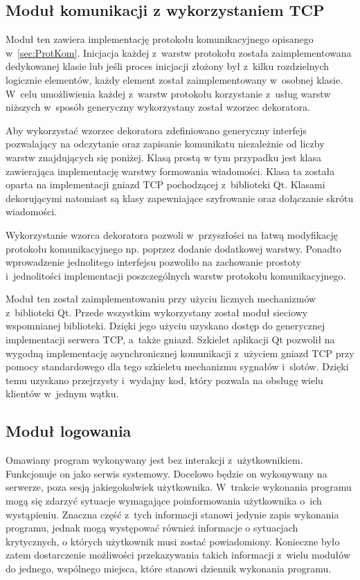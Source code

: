 \subsection[Moduł TCP][Moduł komunikacji z wykorzystaniem TCP]{Moduł komunikacji z wykorzystaniem TCP}

Moduł ten zawiera implementację protokołu komunikacyjnego opisanego
w~\ref{sec:ProtKom}. Inicjacja każdej z~warstw protokołu została
zaimplementowana dedykowanej klasie lub jeśli proces inicjacji złożony
był z~kilku rozdzielnych logicznie elementów, każdy element został
zaimplementowany w~osobnej klasie. W~celu umożliwienia każdej z~warstw
protokołu korzystanie z~usług warstw niższych w~sposób generyczny
wykorzystany został wzorzec dekoratora.

Aby wykorzystać wzorzec dekoratora zdefiniowano generyczny interfejs
pozwalający na odczytanie oraz zapisanie komunikatu niezależnie od
liczby warstw znajdujących się poniżej. Klasą prostą w tym przypadku
jest klasa zawierająca implementację warstwy formowania
wiadomości. Klasa ta została oparta na implementacji gniazd TCP
pochodzącej z~biblioteki Qt. Klasami dekorującymi natomiast są klasy
zapewniające szyfrowanie oraz dołączanie skrótu wiadomości.


Wykorzystanie wzorca dekoratora pozwoli w~przyszłości na łatwą
modyfikację protokołu komunikacyjnego np. poprzez dodanie dodatkowej
warstwy. Ponadto wprowadzenie jednolitego interfejsu pozwoliło na
zachowanie prostoty i~jednolitości implementacji poszczególnych warstw
protokołu komunikacyjnego.

Moduł ten został zaimplementowaniu przy użyciu licznych mechanizmów
z~biblioteki Qt. Przede wszystkim wykorzystany został moduł sieciowy
wspomnianej biblioteki. Dzięki jego użyciu uzyskano dostęp do
generycznej implementacji serwera TCP, a~także gniazd. Szkielet
aplikacji Qt pozwolił na wygodną implementację asynchronicznej
komunikacji z~użyciem gniazd TCP przy pomocy standardowego dla tego
szkieletu mechanizmu sygnałów i~slotów. Dzięki temu uzyskano
przejrzysty i~wydajny kod, który pozwala na obsługę wielu klientów
w~jednym wątku.

\subsection[Moduł logowania][Moduł logowania]{Moduł logowania}

Omawiany program wykonywany jest bez interakcji
z~użytkownikiem. Funkcjonuje on jako serwis systemowy. Docelowo będzie
on wykonywany na serwerze, poza sesją jakiegokolwiek
użytkownika. W~trakcie wykonania programu mogą się zdarzyć sytuacje
wymagające poinformowania użytkownika o~ich wystąpieniu. Znaczna część
z~tych informacji stanowi jedynie zapis wykonania programu, jednak
mogą występować również informacje o sytuacjach krytycznych, o których
użytkownik musi zostać powiadomiony. Konieczne było zatem dostarczenie
możliwości przekazywania takich informacji z~wielu modułów do jednego,
wspólnego miejsca, które stanowi dziennik wykonania programu.

